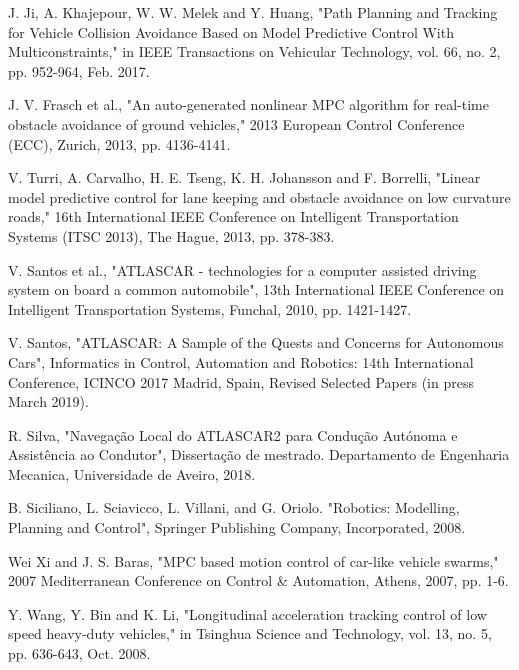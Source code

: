\documentclass[conference,11pt]{IEEEtran}
\begin{document}
\begin{thebibliography}{00}
	J. Ji, A. Khajepour, W. W. Melek and Y. Huang, "Path Planning and Tracking for Vehicle Collision Avoidance Based on Model Predictive Control With Multiconstraints," in IEEE Transactions on Vehicular Technology, vol. 66, no. 2, pp. 952-964, Feb. 2017.
	
	J. V. Frasch et al., "An auto-generated nonlinear MPC algorithm for real-time obstacle avoidance of ground vehicles," 2013 European Control Conference (ECC), Zurich, 2013, pp. 4136-4141.
	
	V. Turri, A. Carvalho, H. E. Tseng, K. H. Johansson and F. Borrelli, "Linear model predictive control for lane keeping and obstacle avoidance on low curvature roads," 16th International IEEE Conference on Intelligent Transportation Systems (ITSC 2013), The Hague, 2013, pp. 378-383.	
	
		

	V. Santos et al., "ATLASCAR - technologies for a computer assisted driving system on board a common automobile", 13th International IEEE Conference on Intelligent Transportation Systems, Funchal, 2010, pp. 1421-1427.
		
	V. Santos, "ATLASCAR: A Sample of the Quests and Concerns for Autonomous Cars", Informatics in Control, Automation and Robotics: 14th International Conference, ICINCO 2017 Madrid, Spain, Revised Selected Papers (in press March 2019).
		
    R. Silva, "Navegação Local do ATLASCAR2 para Condução Autónoma e Assistência ao Condutor", Dissertação de mestrado. Departamento de Engenharia Mecanica, Universidade de Aveiro, 2018.
    
	B. Siciliano, L. Sciavicco, L. Villani, and G. Oriolo. "Robotics: Modelling, Planning and Control", Springer Publishing Company, Incorporated, 2008. 
	
	Wei Xi and J. S. Baras, "MPC based motion control of car-like vehicle swarms," 2007 Mediterranean Conference on Control \& Automation, Athens, 2007, pp. 1-6.
	
	
	Y. Wang, Y. Bin and K. Li, "Longitudinal acceleration tracking control of low speed heavy-duty vehicles," in Tsinghua Science and Technology, vol. 13, no. 5, pp. 636-643, Oct. 2008.
	

\end{thebibliography}
\end{document}
